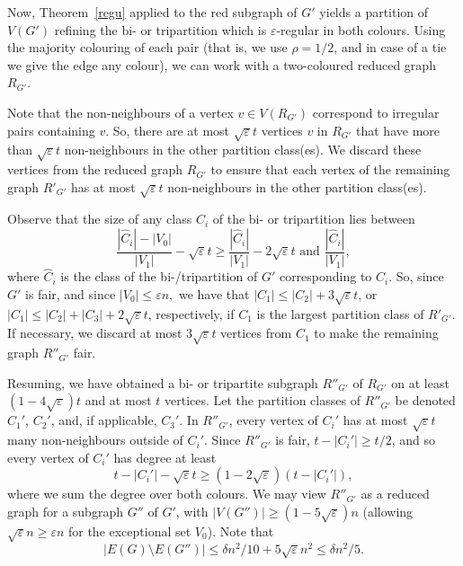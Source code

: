 \documentclass[a4paper,10pt]{article}
\let\eps\varepsilon
\begin{document}
Now, Theorem~\ref{regu} applied to the red subgraph of $G'$ yields a partition of $V(G')$ refining the bi- or tripartition which is $\eps$-regular in both colours. Using the majority colouring of each pair (that is, we use $\rho=1/2$, and in case of a tie we give the edge any colour), we can work with a two-coloured reduced graph~$R_{G'}$. 

 Note that the non-neighbours of a vertex $v\in V(R_{G'})$ correspond to irregular pairs containing $v$.
So, there are at most $\sqrt\eps t$ vertices $v$ in $R_{G'}$ that have more than $\sqrt\eps t$ non-neighbours in the other partition class(es).
We discard these vertices from the reduced graph $R_{G'}$ to ensure that each vertex of the remaining graph $R'_{G'}$ has at most $\sqrt\eps t$ non-neighbours in the other partition class(es). 

Observe that the size of any class $C_i$ of the bi- or tripartition lies between 
\begin{equation}\label{parti-class}
\frac{|\hat C_i|-|V_0|}{|V_1|}-\sqrt\eps t\geq \frac{|\hat C_i|}{|V_1|} -2\sqrt\eps t\text{ \  \ and \ \ }\frac{|\hat C_i|}{|V_1|},
\end{equation}
 where $\hat C_i$ is the class of the bi-/tripartition of $G'$ corresponding to $C_i$.  So, since~$G'$ is fair, and since $|V_0|\leq \eps n,$ we have that $|C_1|\leq |C_2|+3\sqrt\eps t$, or $|C_1|\leq |C_2|+|C_3|+2\sqrt\eps t$, respectively, if $C_1$ is the largest partition class of $R'_{G'}$. 
If necessary, we discard at most $3\sqrt\eps t$ vertices from $C_1$ to make the remaining  graph $R''_{G'}$ fair.

Resuming, we have obtained a bi- or tripartite subgraph $R''_{G'}$ of $R_{G'}$  on  at least $(1-4\sqrt\eps )t$ and at most $t$ vertices.
Let the partition classes of $R''_{G'}$ be denoted $C_1'$, $C_2'$, and, if applicable, $C_3'$.
In $R''_{G'}$, every vertex of $C_i'$ has at most $\sqrt \eps t$ many non-neighbours outside of $C_i'$.
Since $R''_{G'}$ is fair, $t-|C_i'| \ge t/2$, and so every vertex of $C_i'$ has degree at least
\[
t-|C_i'|-\sqrt\eps t \ge (1-2\sqrt\eps)(t-|C_i'|),
\]
where we sum the degree over both colours.
We may view $R''_{G'}$ as a reduced graph for a subgraph $G''$ of $G'$, with $|V(G'')|\geq (1-5\sqrt\eps )n$ (allowing $\sqrt\eps n \geq \eps n$ for the exceptional set $V_0$). Note that 
\begin{equation}\label{fewedgeslost}
|E(G)\setminus E(G'')|\leq \delta n^2/10 + 5\sqrt\eps n^2\leq \delta n^2/5.
\end{equation}
\end{document}
